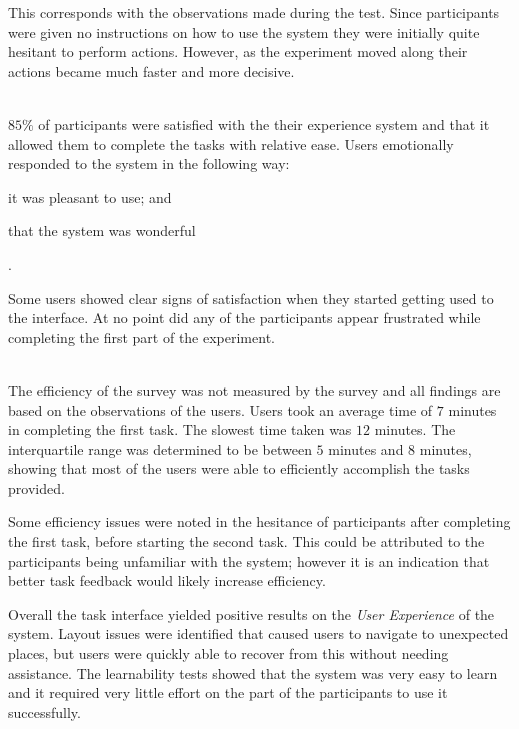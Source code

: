 \documentclass[12pt,a4paper]{report}
\begin{document}
\begin{description}
    	This corresponds with the observations made during the test. Since
    	participants were given no instructions on how to use the system they
    	were initially quite hesitant to perform actions. However, as the
    	experiment moved along their actions became much faster and more
    	decisive.

     \item[Satisfaction] \hfill \\
        $85\%$ of participants were satisfied with the their experience
	system and that it allowed
        them to complete the tasks with relative ease. Users emotionally
        responded to the system in the following way: \begin{inparaenum}[(i)]
    	\item it was pleasant to use; and \item that the system was
        wonderful\end{inparaenum}.

        Some users showed clear signs of satisfaction when they started getting
        used to the interface. At no point did any of the participants appear
        frustrated while completing the first part of the experiment.

    \item[Efficiency] \hfill \\
        The efficiency of the survey was not measured by the survey and all
        findings are based on the observations of the users. Users took an
        average time of $7$ minutes in completing the first task. The slowest
        time taken was $12$ minutes. The interquartile range was determined
        to be between $5$ minutes and $8$ minutes, showing that most of the
        users were able to efficiently accomplish the tasks provided.

        Some efficiency issues were noted in the hesitance of participants
        after completing the first task, before starting the second task.
        This could be attributed to the participants being unfamiliar with the
        system; however it is an indication that better task feedback would
        likely increase efficiency.
\end{description}
Overall the task interface yielded positive results on the \emph{User
Experience} of the system. Layout issues were identified that caused users
to navigate to unexpected places, but users were quickly able to recover from
this without needing assistance. The learnability tests showed that the system
was very easy to learn and it required very little effort on the part of the
participants to use it successfully.
\end{document}
